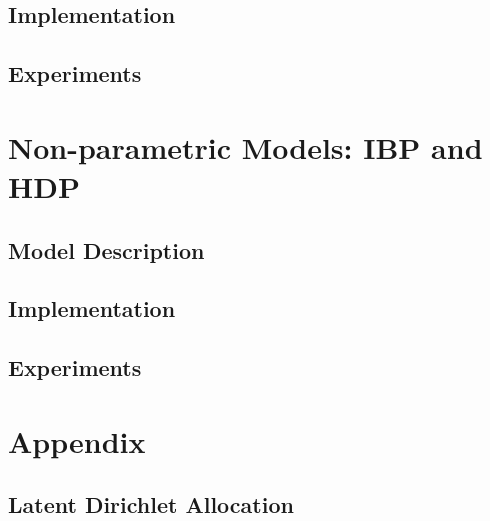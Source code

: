 \documentclass{article}
\begin{document}
\subsection{Implementation} 
\subsection{Experiments} 



\section{Non-parametric Models: IBP and HDP} 
\label{nonparametricsec}
\subsection{Model Description} 
\subsection{Implementation} 
\subsection{Experiments} 







\section{Appendix} 
\subsection{Latent Dirichlet Allocation}
\end{document}
